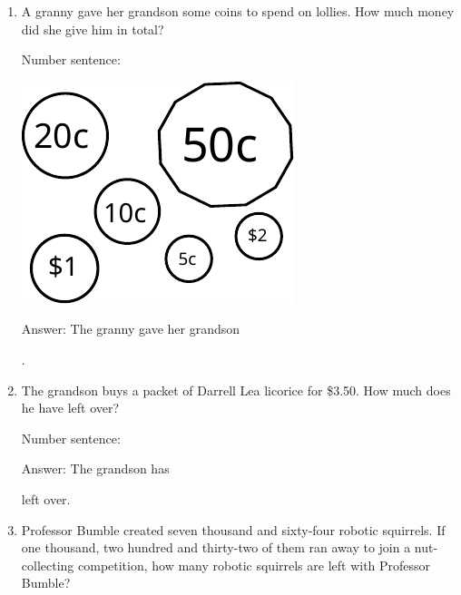 \documentclass{tufte-book}
\begin{document}
\begin{enumerate}
\item A granny gave her grandson some coins to spend on lollies. How much
money did she give him in total?

\medskip Number sentence:  \dotfill\medskip

\begin{marginfigure}
\includegraphics[width=\textwidth]{fig/42_coins}
\end{marginfigure}

Answer: The granny gave her grandson
\dotfill\medskip\par\mbox{}\dotfill\medskip\par\mbox{}\dotfill\bigskip.

\item The grandson buys a packet of Darrell Lea licorice for \$3.50.
How much does he have left over?

\medskip Number sentence:  \dotfill\medskip

Answer: The grandson has
\dotfill\medskip\par\mbox{}\dotfill\medskip
left over.

\item Professor Bumble created seven thousand and sixty-four robotic squirrels. If one thousand, two hundred and thirty-two of them ran away to join a nut-collecting competition, how many robotic squirrels are left with Professor Bumble?


\end{enumerate}
\end{document}
